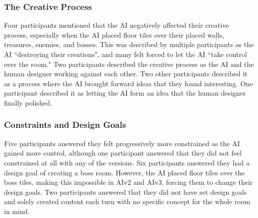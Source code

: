 \subsubsection{The Creative Process}

Four participants mentioned that the AI negatively affected their creative process, especially when the AI placed floor tiles over their placed walls, treasures, enemies, and bosses. This was described by multiple participants as the AI ``destroying their creations", and many felt forced to let the AI ``take control over the room." Two participants described the creative process as the AI and the human designer working against each other. Two other participants described it as a process where the AI brought forward ideas that they found interesting. One participant described it as letting the AI form an idea that the human designer finally polished. 

\subsubsection{Constraints and Design Goals}

Five participants answered they felt progressively more constrained as the AI gained more control, although one participant answered that they did not feel constrained at all with any of the versions. Six participants answered they had a design goal of creating a boss room. However, the AI placed floor tiles over the boss tiles, making this impossible in AIv2 and AIv3, forcing them to change their design goals. Two participants answered that they did not have set design goals and solely created content each turn with no specific concept for the whole room in mind.




